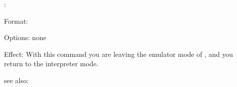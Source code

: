 \inter:

Format: 

Options: none

Effect: With this command you are leaving the emulator mode of \RELFUN{},
	and you return to the interpreter mode.

see also: \emul 
